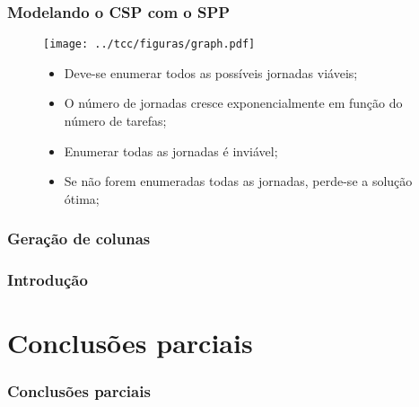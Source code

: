 \documentclass{beamer}
\begin{document}
\begin{frame}
    \frametitle{Modelando o CSP com o SPP}
    \begin{figure}[!htb]
        \centering
        \begin{minipage}{0.48\textwidth}
{
    \centering
    \texttt{[image: ../tcc/figuras/graph.pdf]}
    \label{treta}
}
        \end{minipage}
%
        \begin{minipage}{.48\textwidth}
            \begin{itemize}
                \item Deve-se enumerar todos as possíveis jornadas viáveis;
                \item O número de jornadas cresce exponencialmente em função do número de tarefas;
                \item Enumerar todas as jornadas é inviável;
                \item Se não forem enumeradas todas as jornadas, perde-se a solução ótima;
            \end{itemize}
        \end{minipage}
    \end{figure}

\end{frame}

\begin{frame}
    \frametitle{Geração de colunas}

\end{frame}

\begin{frame}
    \frametitle{Introdução}

\end{frame}

\section{Conclusões parciais}
\begin{frame}
    \frametitle{Conclusões parciais}

\end{frame}


\begin{frame}
    \printbibliography
\end{frame}
\end{document}

